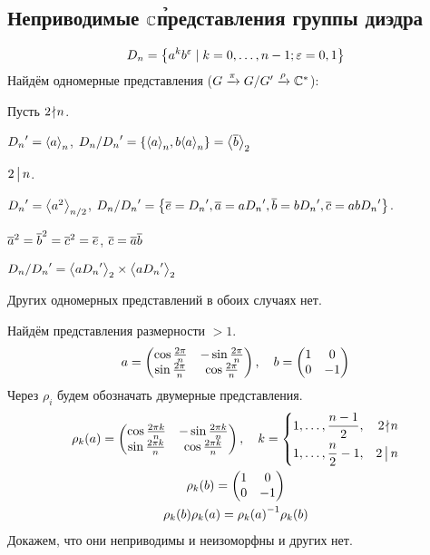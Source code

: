 \subsection{Неприводимые $\mathbb{C}$\h представления группы диэдра}
$$
	D_n = \left\{a^k b^{\varepsilon} \mid k = 0 ,\ldots, n - 1; \varepsilon = 0, 1\right\}
$$
Найдём одномерные представления ($G \xrightarrow{\pi} G/G' \xrightarrow{\rho} \mathbb{C}^*$):
\begin{points}{-3}
	\item Пусть $2 \!\nmid\! n$.

		${D_n}' = {\left\langle a\right\rangle}_n$,
		$D_n / {D_n}' = \left\{{\left\langle a\right\rangle}_n, b {\left\langle a\right\rangle}_n\right\} = {\left\langle\overline{b}\right\rangle}_2$
	\item $2 \,\bigl\rvert\, n$.

		${D_n}' = {\left\langle a^2\right\rangle}_{n/2}$,
		$D_n/{D_n}' = \left\{\overline{e} = {D_n}', \overline{a} = a{D_n}', \overline{b} = b{D_n}', \overline{c} = ab{D_n}'\right\}$.

		${\overline{a}}^2 = {\overline{b}}^2 = {\overline{c}}^2 = \overline{e}$, $\overline{c} = \overline{a} \overline{b}$

		$D_n / {D_n}' = {\left\langle a {D_n}'\right\rangle}_2 \times {\left\langle a {D_n}'\right\rangle}_2$
\end{points}
Других одномерных представлений в обоих случаях нет.

Найдём представления размерности $> 1$.
$$
	a = \begin{pmatrix}\cos \frac{2\pi}n & -\sin \frac{2 \pi}n \\ \sin \frac{2\pi}n & \cos \frac{2 \pi}n\end{pmatrix}, \quad
	b = \begin{pmatrix}1 & 0 \\ 0 & -1\end{pmatrix}
$$
Через $\rho_i$ будем обозначать двумерные представления.
\begin{gather*}
	\rho_k(a) = \begin{pmatrix}
			\cos \frac{2\pi k}n & -\sin \frac{2 \pi k}n \\
			\sin \frac{2\pi k}n & \cos \frac{2 \pi k}n
			\end{pmatrix}, \quad 
	k = \left\{\begin{aligned}
			1 ,\ldots, \frac{n - 1}2, && 2 \!\nmid\! n \\
			1 ,\ldots, \frac n 2 - 1, && 2 \,\bigl\rvert\, n
		\end{aligned}\right. \\
	\rho_k(b) = \begin{pmatrix}1 & 0 \\ 0 & -1\end{pmatrix} \\
	\rho_k(b) \rho_k(a) = {\rho_k(a)}^{-1} \rho_k(b)
\end{gather*}
Докажем, что они неприводимы и неизоморфны  и других нет.

